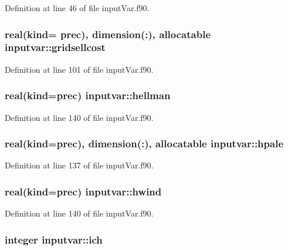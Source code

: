 Definition at line 46 of file input\-Var.\-f90.

\hypertarget{classinputvar_a2f72c3ce64312b528c0679cbd950fb8f}{
\subsubsection[{gridsellcost}]{\setlength{\rightskip}{0pt plus 5cm}real(kind= prec), dimension(\-:), allocatable inputvar\-::gridsellcost}}\label{classinputvar_a2f72c3ce64312b528c0679cbd950fb8f}


Definition at line 101 of file input\-Var.\-f90.

\hypertarget{classinputvar_ad9ba538cb5982defe216a14bc80bf73e}{
\subsubsection[{hellman}]{\setlength{\rightskip}{0pt plus 5cm}real(kind=prec) inputvar\-::hellman}}\label{classinputvar_ad9ba538cb5982defe216a14bc80bf73e}


Definition at line 140 of file input\-Var.\-f90.

\hypertarget{classinputvar_a1a0e84530e6db6a46aabfcea51b086bf}{
\subsubsection[{hpale}]{\setlength{\rightskip}{0pt plus 5cm}real(kind=prec), dimension(\-:), allocatable inputvar\-::hpale}}\label{classinputvar_a1a0e84530e6db6a46aabfcea51b086bf}


Definition at line 137 of file input\-Var.\-f90.

\hypertarget{classinputvar_aef589b7d9f863ca157c6d7921781fe58}{
\subsubsection[{hwind}]{\setlength{\rightskip}{0pt plus 5cm}real(kind=prec) inputvar\-::hwind}}\label{classinputvar_aef589b7d9f863ca157c6d7921781fe58}


Definition at line 140 of file input\-Var.\-f90.

\hypertarget{classinputvar_a69cdcc78492d1a96e3f02ee2915f207d}{
\subsubsection[{ich}]{\setlength{\rightskip}{0pt plus 5cm}integer inputvar\-::ich}}\label{classinputvar_a69cdcc78492d1a96e3f02ee2915f207d}


